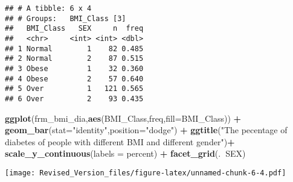 \documentclass[]{article}
\newenvironment{Shaded}{\begin{snugshade}}{\end{snugshade}}
\newcommand{\KeywordTok}[1]{\textcolor[rgb]{0.13,0.29,0.53}{\textbf{#1}}}
\newcommand{\DataTypeTok}[1]{\textcolor[rgb]{0.13,0.29,0.53}{#1}}
\newcommand{\DecValTok}[1]{\textcolor[rgb]{0.00,0.00,0.81}{#1}}
\newcommand{\StringTok}[1]{\textcolor[rgb]{0.31,0.60,0.02}{#1}}
\newcommand{\CommentTok}[1]{\textcolor[rgb]{0.56,0.35,0.01}{\textit{#1}}}
\newcommand{\OperatorTok}[1]{\textcolor[rgb]{0.81,0.36,0.00}{\textbf{#1}}}
\newcommand{\NormalTok}[1]{#1}
\begin{document}
\begin{Shaded}
\end{Shaded}

\begin{verbatim}
## # A tibble: 6 x 4
## # Groups:   BMI_Class [3]
##   BMI_Class   SEX     n  freq
##   <chr>     <int> <int> <dbl>
## 1 Normal        1    82 0.485
## 2 Normal        2    87 0.515
## 3 Obese         1    32 0.360
## 4 Obese         2    57 0.640
## 5 Over          1   121 0.565
## 6 Over          2    93 0.435
\end{verbatim}

\begin{Shaded}
\begin{Highlighting}[]
\KeywordTok{ggplot}\NormalTok{(frm_bmi_dia,}\KeywordTok{aes}\NormalTok{(BMI_Class,freq,}\DataTypeTok{fill=}\NormalTok{BMI_Class)) }\OperatorTok{+}
\StringTok{  }\KeywordTok{geom_bar}\NormalTok{(}\DataTypeTok{stat=}\StringTok{"identity"}\NormalTok{,}\DataTypeTok{position=}\StringTok{"dodge"}\NormalTok{) }\OperatorTok{+}
\StringTok{  }\KeywordTok{ggtitle}\NormalTok{(}\StringTok{"The pecentage of diabetes of people with different BMI and different gender"}\NormalTok{)}\OperatorTok{+}
\StringTok{  }\KeywordTok{scale_y_continuous}\NormalTok{(}\DataTypeTok{labels =}\NormalTok{ percent) }\OperatorTok{+}
\StringTok{  }\KeywordTok{facet_grid}\NormalTok{(.}\OperatorTok{~}\NormalTok{SEX)}
\end{Highlighting}
\end{Shaded}

\texttt{[image: Revised\_Version\_files/figure-latex/unnamed-chunk-6-4.pdf]}
\end{document}

